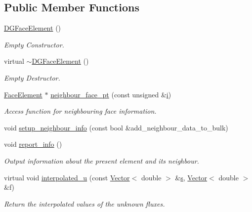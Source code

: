 \subsection*{Public Member Functions}
\begin{DoxyCompactItemize}
\item 
\hyperlink{classoomph_1_1DGFaceElement_a6cfed44ec658ef834a27228a4b75e2fe}{D\+G\+Face\+Element} ()
\begin{DoxyCompactList}\small\item\em Empty Constructor. \end{DoxyCompactList}\item 
virtual \hyperlink{classoomph_1_1DGFaceElement_a03b59fa4babd8c2300d7cd733782cd08}{$\sim$\+D\+G\+Face\+Element} ()
\begin{DoxyCompactList}\small\item\em Empty Destructor. \end{DoxyCompactList}\item 
\hyperlink{classoomph_1_1FaceElement}{Face\+Element} $\ast$ \hyperlink{classoomph_1_1DGFaceElement_aef1ba8459a58727387d5217daed72a41}{neighbour\+\_\+face\+\_\+pt} (const unsigned \&\hyperlink{cfortran_8h_adb50e893b86b3e55e751a42eab3cba82}{i})
\begin{DoxyCompactList}\small\item\em Access function for neighbouring face information. \end{DoxyCompactList}\item 
void \hyperlink{classoomph_1_1DGFaceElement_a23d30d2a32fb5c04531de2339e21ea06}{setup\+\_\+neighbour\+\_\+info} (const bool \&add\+\_\+neighbour\+\_\+data\+\_\+to\+\_\+bulk)
\item 
void \hyperlink{classoomph_1_1DGFaceElement_a2a0dd5c6307080b580fc696a8b65fb0e}{report\+\_\+info} ()
\begin{DoxyCompactList}\small\item\em Output information about the present element and its neighbour. \end{DoxyCompactList}\item 
virtual void \hyperlink{classoomph_1_1DGFaceElement_ab58cee592775f0ae54ac0b0087eb9d35}{interpolated\+\_\+u} (const \hyperlink{classoomph_1_1Vector}{Vector}$<$ double $>$ \&\hyperlink{cfortran_8h_ab7123126e4885ef647dd9c6e3807a21c}{s}, \hyperlink{classoomph_1_1Vector}{Vector}$<$ double $>$ \&f)
\begin{DoxyCompactList}\small\item\em Return the interpolated values of the unknown fluxes. \end{DoxyCompactList}\item 

\end{DoxyCompactItemize}
